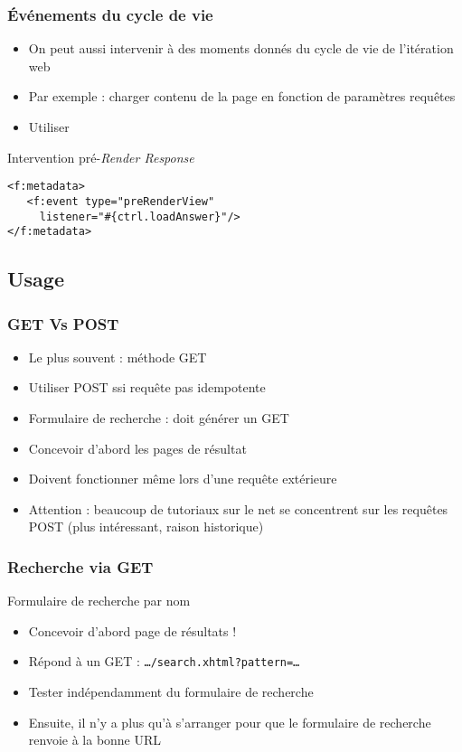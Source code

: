 \documentclass[english, french]{beamer}
\begin{document}
\begin{frame}[fragile]
	\frametitle{Événements du cycle de vie}
	\begin{itemize}
		\item On peut aussi intervenir à des moments donnés du cycle de vie de l’itération web
		\item Par exemple : charger contenu de la page en fonction de paramètres requêtes
		\item Utiliser 
	\end{itemize}
	\begin{exampleblock}{Intervention pré-\emph{Render Response}}
		\begin{lstlisting}
<f:metadata>
   <f:event type="preRenderView"
     listener="#{ctrl.loadAnswer}"/>
</f:metadata>
		\end{lstlisting}
	\end{exampleblock}
\end{frame}

\subsection{Usage}
\begin{frame}
	\frametitle{GET Vs POST}
	\begin{itemize}
		\item Le plus souvent : méthode GET
		\item Utiliser POST \alert{ssi requête pas idempotente}
		\item Formulaire de recherche : doit générer un GET
		\item Concevoir d’abord les pages de résultat
		\item Doivent fonctionner même lors d’une requête extérieure
		\item Attention : beaucoup de tutoriaux sur le net se concentrent sur les requêtes POST {\tiny (plus intéressant, raison historique)}
	\end{itemize}
\end{frame}

\begin{frame}
	\frametitle{Recherche via GET}
	\begin{exampleblock}{Formulaire de recherche par nom}
		\begin{itemize}
			\item Concevoir d’abord page de résultats !
			\item Répond à un GET : \texttt{…/search.xhtml?pattern=…}
			\item Tester indépendamment du formulaire de recherche
			\item Ensuite, il n’y a plus qu’à s’arranger pour que le formulaire de recherche renvoie à la bonne URL
		\end{itemize}
	\end{exampleblock}
\end{frame}
\end{document}
